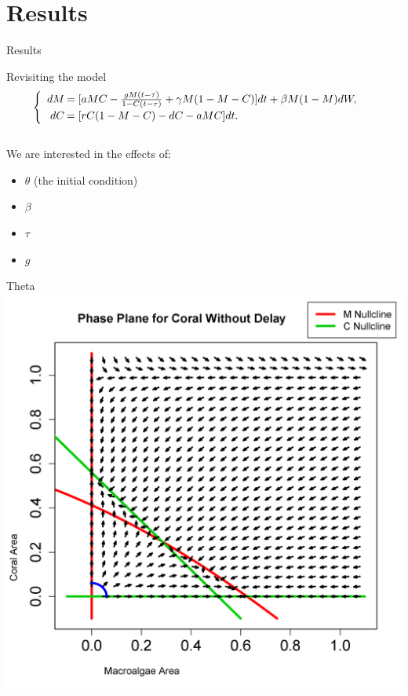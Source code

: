 
\section{Results}

\begin{frame}{Results}
  
  Revisiting the model
  $$\begin{cases}
    \begin{array}{rl}
      dM\hspace{-.8em}&=[aMC - \frac{gM(t-\tau)}{1-C(t-\tau)} + \gamma M (1-M-C)]dt+\beta M(1-M)dW,\\
      dC\hspace{-.8em}&=[rC(1-M-C) - dC - aMC]dt.\\
    \end{array}
    \end{cases}$$\\
  We are interested in the effects of:
  \begin{itemize}
  \item $\theta$ (the initial condition)\\
  \item $\beta$\\
  \item $\tau$\\
  \item $g$\\
  \end{itemize}
  
  

\end{frame}

\begin{frame}{Theta}
\includegraphics[scale=.325]{nullclinesarc.png}

\end{frame}

